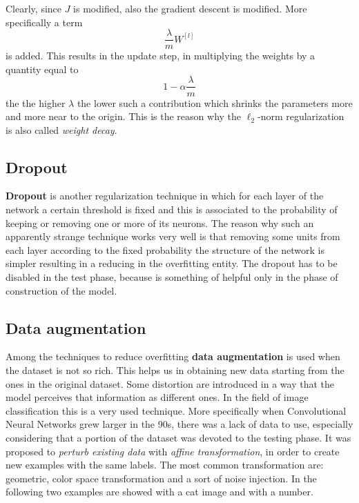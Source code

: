 Clearly, since $J$ is modified, also the gradient descent is modified. More specifically a term 
\begin{equation*}
    \frac{\lambda}{m} W^{[l]}
\end{equation*}
is added. This results in the update step, in multiplying the weights by a quantity equal to 
\begin{equation*}
    1-\alpha\frac{\lambda}{m}
\end{equation*}
the the higher $\lambda$ the lower such a contribution which shrinks the parameters more and more near to the origin. This is the reason why the $\ell_2$-norm regularization is also called \textit{weight decay}.

\subsection{Dropout}
\textbf{Dropout} is another regularization technique in which for each layer of the network a certain threshold is fixed and this is associated to the probability of keeping or removing one or more of its neurons. The reason why such an apparently strange technique works very well is that removing some units from each layer according to the fixed probability the structure of the network is simpler resulting in a reducing in the overfitting entity. The dropout has to be disabled in the test phase, because is something of helpful only in the phase of construction of the model.

\subsection{Data augmentation}
Among the techniques to reduce overfitting \textbf{data augmentation} is used when the dataset is not so rich. This helps us in obtaining new data starting from the ones in the original dataset. Some distortion are introduced in a way that the model perceives that information as different ones. In the field of image classification this is a very used technique. More specifically when Convolutional Neural Networks grew larger in the 90s, there was a lack of data to use, especially considering that a portion of the dataset was devoted to the testing phase. It was proposed to \textit{perturb existing data} with \textit{affine transformation}, in order to create new examples with the same labels. The most common transformation are: geometric, color space transformation and a sort of noise injection. In the following two examples  are showed with a cat image and with a number.

